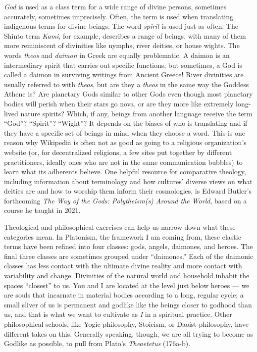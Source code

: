 \documentclass[
]{book}
\begin{document}
\emph{God} is used as a class term for a wide range of divine persons, sometimes accurately, sometimes imprecisely. Often, the term is used when translating indigenous terms for divine beings. The word \emph{spirit} is used just as often. The Shinto term \emph{Kami}, for example, describes a range of beings, with many of them more reminiscent of divinities like nymphs, river deities, or house wights. The words \emph{theos} and \emph{daimon} in Greek are equally problematic. A daimon is an intermediary spirit that carries out specific functions, but sometimes, a God is called a daimon in surviving writings from Ancient Greece! River divinities are usually referred to with \emph{theos}, but are they a \emph{theos} in the same way the Goddess Athene is? Are planetary Gods similar to other Gods even though most planetary bodies will perish when their stars go nova, or are they more like extremely long-lived nature spirits? Which, if any, beings from another language receive the term ``God''? ``Spirit''? ``Wight''? It depends on the biases of who is translating and if they have a specific set of beings in mind when they choose a word. This is one reason why Wikipedia is often not as good as going to a religious organization's website (or, for decentralized religions, a few sites put together by different practitioners, ideally ones who are not in the same communication bubbles) to learn what its adherents believe. One helpful resource for comparative theology, including information about terminology and how cultures' diverse views on what deities are and how to worship them inform their cosmologies, is Edward Butler's forthcoming \emph{The Way of the Gods: Polytheism(s) Around the World}, based on a course he taught in 2021.

Theological and philosophical exercises can help us narrow down what these categories mean. In Platonism, the framework I am coming from, these elastic terms have been refined into four classes: gods, angels, daimones, and heroes. The final three classes are sometimes grouped under ``daimones.'' Each of the daimonic classes has less contact with the ultimate divine reality and more contact with variability and change. Divinities of the natural world and household inhabit the spaces ``closest'' to us. You and I are located at the level just below heroes --- we are souls that incarnate in material bodies according to a long, regular cycle; a small sliver of us is permanent and godlike like the beings closer to godhood than us, and that is what we want to cultivate as \emph{I} in a spiritual practice. Other philosophical schools, like Yogic philosophy, Stoicism, or Daoist philosophy, have different takes on this. Generally speaking, though, we are all trying to become as Godlike as possible, to pull from Plato's \emph{Theaetetus} (176a-b).
\end{document}
